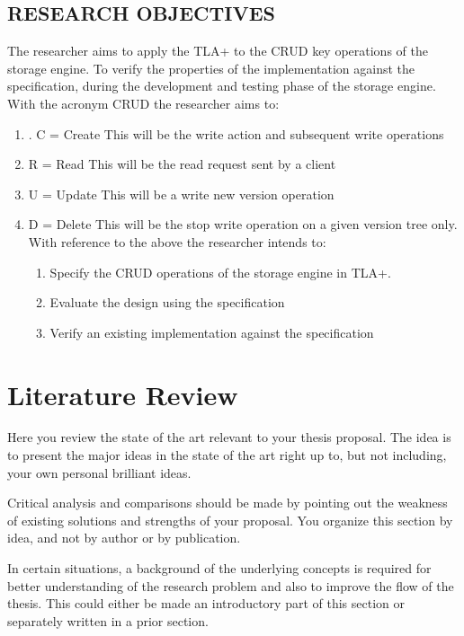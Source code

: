 \documentclass[11pt,a4paper,oneside]{book} %
\numberwithin{equation}{section}
\begin{document}
\section{RESEARCH OBJECTIVES}
The researcher aims to apply the TLA+ to the CRUD key operations of the storage engine. To
verify the properties of the implementation against the specification, during the development
and testing phase of the storage engine.
With the acronym CRUD the researcher aims to:
\begin{enumerate}

\item. C = Create
This will be the write action and subsequent write operations
\item R = Read
This will be the read request sent by a client
\item U = Update
This will be a write new version operation
\item D = Delete
This will be the stop write operation on a given version tree only.
With reference to the above the researcher intends to:
\begin{enumerate}
\item Specify the CRUD operations of the storage engine in TLA+.
\item Evaluate the design using the specification
\item Verify an existing implementation against the specification
\end{enumerate}
\end{enumerate}





\chapter{Literature Review}\label{c-review}
Here you review the state of the art relevant to your thesis proposal. The idea is to present the major ideas in the state of the art right up to, but not including, your own personal brilliant ideas.

Critical analysis and comparisons should be made by pointing out the weakness of existing solutions and strengths of your proposal. You organize this section by idea, and not by author or by publication.

In certain situations, a background of the underlying concepts is required for better understanding of the research problem and also to improve the flow of the thesis. This could either be made an introductory part of this section or separately written in a prior section.
\end{document}
